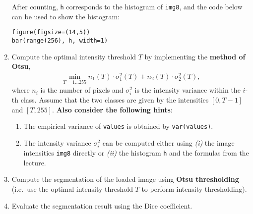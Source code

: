 \documentclass[12pt,a4paper]{article}
\begin{document}
\begin{enumerate}
    After counting, \texttt{h} corresponds to the histogram of \texttt{img8}, and the code below can be used to show the histogram:
\begin{Verbatim}[frame=single]
figure(figsize=(14,5))
bar(range(256), h, width=1)
\end{Verbatim}
    \item Compute the optimal intensity threshold $T$ by implementing the \textbf{method of Otsu},
    \begin{gather}
        \min_{T = 1 \dots 255} n_1\left(T\right) \cdot \sigma_1^2\left(T\right) + n_2\left(T\right) \cdot \sigma_2^2\left(T\right),
    \end{gather}
    where $n_i$ is the number of pixels and $\sigma_i^2$ is the intensity variance within the $i$-th class. Assume that the two classes are given by the intensities $\left[0, T - 1\right]$ and $\left[T, 255\right]$. \textbf{Also consider the following hints}:
    \begin{enumerate}
        \item The empirical variance of \texttt{values} is obtained by \texttt{var(values)}.
        \item The intensity variance $\sigma_i^2$ can be computed either using \textit{(i)} the image intensities \texttt{img8} directly or \textit{(ii)} the histogram \texttt{h} and the formulas from the lecture.
    \end{enumerate}
    \item Compute the segmentation of the loaded image using \textbf{Otsu thresholding} (i.e.\ use the optimal intensity threshold $T$ to perform intensity thresholding).
    \item Evaluate the segmentation result using the Dice coefficient.
\end{enumerate}
\end{document}
